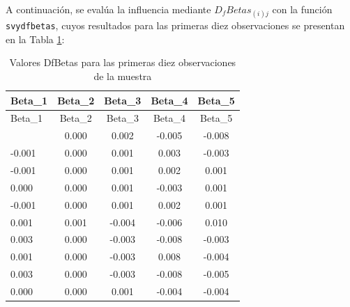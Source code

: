 \documentclass[
  spanish,
  12pt,
]{book}
\newenvironment{Shaded}{\begin{snugshade}}{\end{snugshade}}
\newcommand{\DataTypeTok}[1]{\textcolor[rgb]{0.13,0.29,0.53}{#1}}
\newcommand{\DecValTok}[1]{\textcolor[rgb]{0.00,0.00,0.81}{#1}}
\newcommand{\FunctionTok}[1]{\textcolor[rgb]{0.13,0.29,0.53}{\textbf{#1}}}
\newcommand{\NormalTok}[1]{#1}
\newcommand{\OtherTok}[1]{\textcolor[rgb]{0.56,0.35,0.01}{#1}}
\newcommand{\SpecialCharTok}[1]{\textcolor[rgb]{0.81,0.36,0.00}{\textbf{#1}}}
\newcommand{\StringTok}[1]{\textcolor[rgb]{0.31,0.60,0.02}{#1}}
\begin{document}
A continuación, se evalúa la influencia mediante \(D_{f}Betas_{\left(i\right)j}\) con la función \texttt{svydfbetas}, cuyos resultados para las primeras diez observaciones se presentan en la Tabla \ref{tab:tab-dfbetas-primeros}:

\begin{Shaded}
\end{Shaded}

\begin{longtable}[]{@{}lcccc@{}}
\caption{\label{tab:tab-dfbetas-primeros}Valores DfBetas para las primeras diez observaciones de la muestra}\tabularnewline
\toprule\noalign{}
Beta\_1 & Beta\_2 & Beta\_3 & Beta\_4 & Beta\_5 \\
\midrule\noalign{}
\endfirsthead
\toprule\noalign{}
Beta\_1 & Beta\_2 & Beta\_3 & Beta\_4 & Beta\_5 \\
\midrule\noalign{}
\endhead
\bottomrule\noalign{}
\endlastfoot
0.001 & 0.000 & 0.002 & -0.005 & -0.008 \\
-0.001 & 0.000 & 0.001 & 0.003 & -0.003 \\
-0.001 & 0.000 & 0.001 & 0.002 & 0.001 \\
0.000 & 0.000 & 0.001 & -0.003 & 0.001 \\
-0.001 & 0.000 & 0.001 & 0.002 & 0.001 \\
0.001 & 0.001 & -0.004 & -0.006 & 0.010 \\
0.003 & 0.000 & -0.003 & -0.008 & -0.003 \\
0.001 & 0.000 & -0.003 & 0.008 & -0.004 \\
0.003 & 0.000 & -0.003 & -0.008 & -0.005 \\
0.000 & 0.000 & 0.001 & -0.004 & -0.004 \\
\end{longtable}
\end{document}
